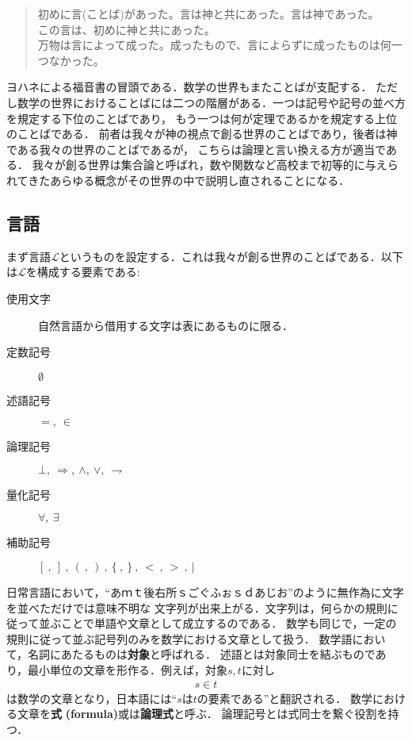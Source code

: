	\begin{quote}
		初めに言(ことば)があった。言は神と共にあった。言は神であった。\\
		この言は、初めに神と共にあった。\\
		万物は言によって成った。成ったもので、言によらずに成ったものは何一つなかった。
	\end{quote}
	ヨハネによる福音書の冒頭である．数学の世界もまたことばが支配する．
	ただし数学の世界におけることばには二つの階層がある．一つは記号や記号の並べ方を規定する下位のことばであり，
	もう一つは何が定理であるかを規定する上位のことばである．
	前者は我々が神の視点で創る世界のことばであり，後者は神である我々の世界のことばであるが，
	こちらは論理と言い換える方が適当である．
	我々が創る世界は集合論と呼ばれ，数や関数など高校まで初等的に与えられてきたあらゆる概念がその世界の中で説明し直されることになる．
	
\subsection{言語}
	
	まず言語$\mathcal{L}$というものを設定する．これは我々が創る世界のことばである．以下は$\mathcal{L}$を構成する要素である:
	\begin{description}
		\item[使用文字] 自然言語から借用する文字は表にあるものに限る．
		\item[定数記号] $\emptyset$
		\item[述語記号] $=,\ \in$
		\item[論理記号] $\bot,\ \Longrightarrow,\ \wedge,\ \vee,\ \rightharpoondown$
		\item[量化記号] $\forall,\ \exists$
		\item[補助記号] $[\ ,\ ]\ ,\ (\ ,\ )\ ,\ \{\ ,\ \}\ ,\ <\ ,\ >\ ,\ |$
	\end{description}
	
	日常言語において，``あｍｔ後右所ｓごぐふぉｓｄあじお''のように無作為に文字を並べただけでは意味不明な
	文字列が出来上がる．文字列は，何らかの規則に従って並ぶことで単語や文章として成立するのである．
	数学も同じで，一定の規則に従って並ぶ記号列のみを数学における文章として扱う．
	数学語において，名詞にあたるものは{\bf 対象}と呼ばれる．
	述語とは対象同士を結ぶものであり，最小単位の文章を形作る．例えば，対象$s,t$に対し
	\begin{align}
		s \in t
	\end{align}
	は数学の文章となり，日本語には``$s$は$t$の要素である''と翻訳される．
	数学における文章を{\bf 式}
	{\bf (formula)}或は{\bf 論理式}と呼ぶ．
	論理記号とは式同士を繋ぐ役割を持つ．
	
